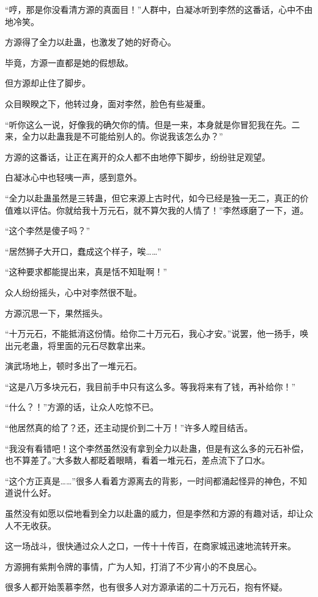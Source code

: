 \begin{this_body}
“哼，那是你没看清方源的真面目！”人群中，白凝冰听到李然的这番话，心中不由地冷笑。

方源得了全力以赴蛊，也激发了她的好奇心。

毕竟，方源一直都是她的假想敌。

但方源却止住了脚步。

众目睽睽之下，他转过身，面对李然，脸色有些凝重。

“听你这么一说，好像我的确欠你的情。但是一来，本身就是你冒犯我在先。二来，全力以赴蛊我是不可能给别人的。你说我该怎么办？”

方源的这番话，让正在离开的众人都不由地停下脚步，纷纷驻足观望。

白凝冰心中也轻咦一声，感到意外。

“全力以赴蛊虽然是三转蛊，但它来源上古时代，如今已经是独一无二，真正的价值难以评估。你就给我十万元石，就不算欠我的人情了！”李然琢磨了一下，道。

“这个李然是傻子吗？”

“居然狮子大开口，蠢成这个样子，唉……”

“这种要求都能提出来，真是恬不知耻啊！”

众人纷纷摇头，心中对李然很不耻。

方源沉思一下，果然摇头。

“十万元石，不能抵消这份情。给你二十万元石，我心才安。”说罢，他一扬手，唤出元老蛊，将里面的元石尽数拿出来。

演武场地上，顿时多出了一堆元石。

“这是八万多块元石，我目前手中只有这么多。等我将来有了钱，再补给你！”

“什么？！”方源的话，让众人吃惊不已。

“他居然真的给了？还，还主动提价到二十万！”许多人瞠目结舌。

“我没有看错吧！这个李然虽然没有拿到全力以赴蛊，但是有这么多的元石补偿，也不算差了。”大多数人都眨着眼睛，看着一堆元石，差点流下了口水。

“这个方正真是……”很多人看着方源离去的背影，一时间都涌起怪异的神色，不知道说什么好。

虽然没有如愿以偿地看到全力以赴蛊的威力，但是李然和方源的有趣对话，却让众人不无收获。

这一场战斗，很快通过众人之口，一传十十传百，在商家城迅速地流转开来。

方源拥有紫荆令牌的事情，广为人知，打消了不少宵小的不良居心。

很多人都开始羡慕李然，也有很多人对方源承诺的二十万元石，抱有怀疑。


\end{this_body}
